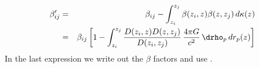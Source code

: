 \begin{eqnarray}
  \beta'_{ij} &=& \beta_{ij} - \int_{z_i}^{z_j} \beta(z_i,z) \beta(z,z_j)\,d\kappa(z) \label{eq:betanew}\\
  &=& \beta_{ij} \left[ 1 - \int_{z_i}^{z_j} \frac{D(z_i,z) D(z,z_j)}{D(z_i,z_j)}\,\frac{4\pi G}{c^2}\,\drho_p\,dr_p(z) \right] \nonumber
\end{eqnarray}
In the last expression we write out the $\beta$ factors and use .